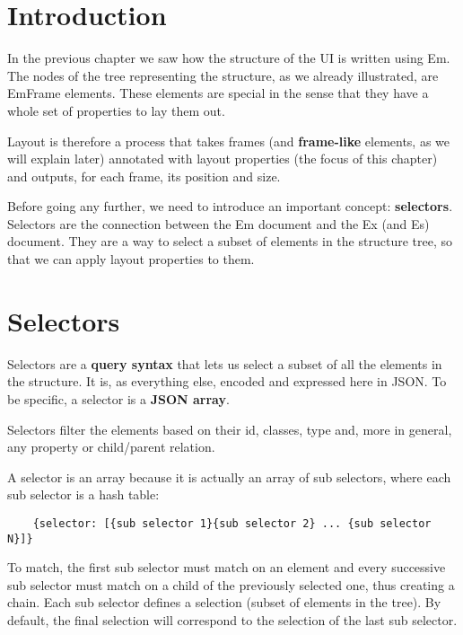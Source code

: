 
\section{Introduction}

In the previous chapter we saw how the structure of the UI is written using Em. The nodes of the tree representing the structure, as we already illustrated, are EmFrame elements. These elements are special in the sense that they have a whole set of properties to lay them out.

Layout is therefore a process that takes frames (and \textbf{frame-like} elements, as we will explain later) annotated with layout properties (the focus of this chapter) and outputs, for each frame, its position and size.

Before going any further, we need to introduce an important concept: \textbf{selectors}. Selectors are the connection between the Em document and the Ex (and Es) document. They are a way to select a subset of elements in the structure tree, so that we can apply layout properties to them.

\section{Selectors}
\label{sec:selectors}

Selectors are a \textbf{query syntax} that lets us select a subset of all the elements in the structure. It is, as everything else, encoded and expressed here in JSON. To be specific, a selector is a \textbf{JSON array}.

Selectors filter the elements based on their id, classes, type and, more in general, any property or child/parent relation.

A selector is an array because it is actually an array of sub selectors, where each sub selector is a hash table:

\begin{verbatim}
    {selector: [{sub selector 1}{sub selector 2} ... {sub selector N}]}
\end{verbatim}

To match, the first sub selector must match on an element and every successive sub selector must match on a child of the previously selected one, thus creating a chain. Each sub selector defines a selection (subset of elements in the tree). By default, the final selection will correspond to the selection of the last sub selector.

